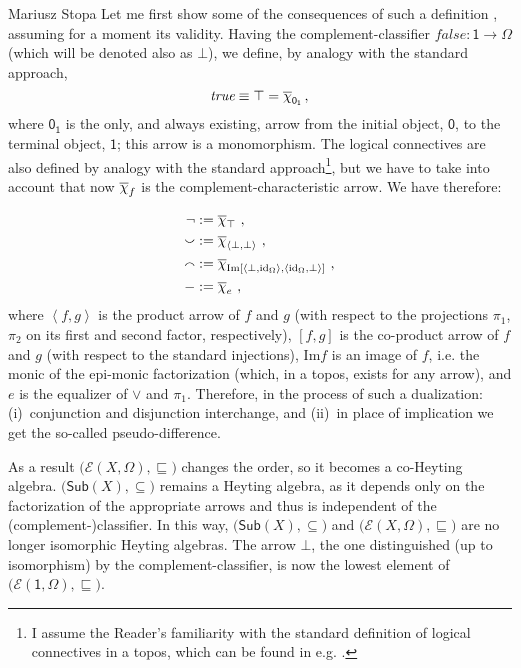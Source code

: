 \begin{artengenv}{Mariusz Stopa}
Let me first show some of the consequences of such a definition  \parencite[cf. e.g.][]{mortensen-1995, estrada-gonzalez-2010}, assuming for a moment its validity. Having the complement-classifier $ \textit{false}:\textsf{1}\to\Omega $ (which will be denoted also as $ \bot $), we define, by analogy with the standard approach,
\begin{equation}\label{true}
\textit{true}\equiv\top=\ochi_{\textsf{0}_{\textsf{1}}}\,,
\end{equation}
where $ \textsf{0}_{\textsf{1}} $ is the only, and always existing, arrow from the initial object, $ \textsf{0} $, to the terminal object, $ \textsf{1} $; this arrow is a monomorphism.
The logical connectives are also defined by analogy with the standard approach\footnote{I assume the Reader's familiarity with the standard definition of logical connectives in a topos, which can be found in e.g. \parencite[p.139]{goldblatt-2006}.}, but we have to take into account that now $ \overline{\chi}_f $ is the complement-characteristic arrow. We have therefore:

\begin{align*}
\lnot &:= \overline{\chi}_{\top} \ ,\\
\smallsmile &:= \overline{\chi}_{\left<\bot, \bot\right>} \ ,\\
\smallfrown &:= \overline{\chi}_{\text{Im}\left[\left<\bot,\text{id}_\Omega\right>,\left<\text{id}_\Omega,\bot\right>\right]} \ ,\\
-&:=\overline{\chi}_e \ ,
\notag
\end{align*}
where $ \left<f, g\right> $ is the product arrow of $ f $ and $ g $ (with respect to the projections $ \pi_1 $, $ \pi_2 $ on its first and second factor, respectively), $ \left[f,g\right] $ is the co-product arrow of $ f $ and $ g $ (with respect to the standard injections), $ \text{Im} f $ is an image of $ f $, i.e. the monic of the epi-monic factorization (which, in a topos, exists for any arrow), and $e$ is the equalizer of $ \lor $ and $ \pi_1 $. Therefore, in the process of such a dualization: (i)~conjunction and disjunction interchange, and (ii)~in place of implication we get the so-called pseudo-difference.

As a result $ \big(\mathcal{E}(X,\Omega), \sqsubseteq\!\big) $ changes the order, so it becomes a co-Heyting algebra. $ \big(\textsf{Sub}(X), \subseteq\!\big) $ remains a Heyting algebra, as it depends only on the factorization of the appropriate arrows and thus is independent of the (complement-)classifier. In this way, $ \big(\textsf{Sub}(X), \subseteq\!\big) $  and $ \big(\mathcal{E}(X,\Omega), \sqsubseteq\!\big) $ are no longer isomorphic Heyting algebras. The arrow $ \bot $, the one distinguished (up to isomorphism) by the complement-classifier, is now the lowest element of $ \big(\mathcal{E}(\textsf{1},\Omega), \sqsubseteq\!\big) $. 


\end{artengenv}
